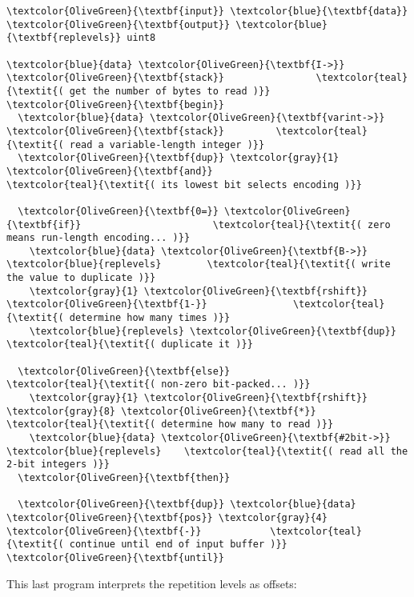 \documentclass{webofc}
\begin{document}
\begin{Verbatim}[commandchars=\\\{\}]
\textcolor{OliveGreen}{\textbf{input}} \textcolor{blue}{\textbf{data}}
\textcolor{OliveGreen}{\textbf{output}} \textcolor{blue}{\textbf{replevels}} uint8

\textcolor{blue}{data} \textcolor{OliveGreen}{\textbf{I->}} \textcolor{OliveGreen}{\textbf{stack}}                \textcolor{teal}{\textit{( get the number of bytes to read )}}
\textcolor{OliveGreen}{\textbf{begin}}
  \textcolor{blue}{data} \textcolor{OliveGreen}{\textbf{varint->}} \textcolor{OliveGreen}{\textbf{stack}}         \textcolor{teal}{\textit{( read a variable-length integer )}}
  \textcolor{OliveGreen}{\textbf{dup}} \textcolor{gray}{1} \textcolor{OliveGreen}{\textbf{and}}                   \textcolor{teal}{\textit{( its lowest bit selects encoding )}}

  \textcolor{OliveGreen}{\textbf{0=}} \textcolor{OliveGreen}{\textbf{if}}                       \textcolor{teal}{\textit{( zero means run-length encoding... )}}
    \textcolor{blue}{data} \textcolor{OliveGreen}{\textbf{B->}} \textcolor{blue}{replevels}        \textcolor{teal}{\textit{( write the value to duplicate )}}
    \textcolor{gray}{1} \textcolor{OliveGreen}{\textbf{rshift}} \textcolor{OliveGreen}{\textbf{1-}}               \textcolor{teal}{\textit{( determine how many times )}}
    \textcolor{blue}{replevels} \textcolor{OliveGreen}{\textbf{dup}}             \textcolor{teal}{\textit{( duplicate it )}}

  \textcolor{OliveGreen}{\textbf{else}}                        \textcolor{teal}{\textit{( non-zero bit-packed... )}}
    \textcolor{gray}{1} \textcolor{OliveGreen}{\textbf{rshift}} \textcolor{gray}{8} \textcolor{OliveGreen}{\textbf{*}}              \textcolor{teal}{\textit{( determine how many to read )}}
    \textcolor{blue}{data} \textcolor{OliveGreen}{\textbf{#2bit->}} \textcolor{blue}{replevels}    \textcolor{teal}{\textit{( read all the 2-bit integers )}}
  \textcolor{OliveGreen}{\textbf{then}}

  \textcolor{OliveGreen}{\textbf{dup}} \textcolor{blue}{data} \textcolor{OliveGreen}{\textbf{pos}} \textcolor{gray}{4} \textcolor{OliveGreen}{\textbf{-}}            \textcolor{teal}{\textit{( continue until end of input buffer )}}
\textcolor{OliveGreen}{\textbf{until}}
\end{Verbatim}

\noindent This last program interprets the repetition levels as offsets:
\end{document}
